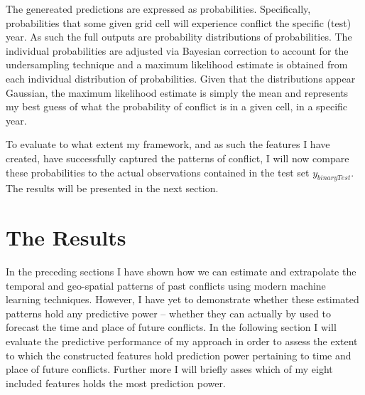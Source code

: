 \documentclass[a4paper]{article}
\begin{document}




The genereated predictions are expressed as probabilities. Specifically, probabilities that some given grid cell will experience conflict the specific (test) year. As such the full outputs are probability distributions of probabilities. The individual probabilities are adjusted via Bayesian correction to account for the undersampling technique and a maximum likelihood estimate is obtained from each individual distribution of probabilities. Given that the distributions appear Gaussian, the maximum likelihood estimate is simply the mean and represents my best guess of what the probability of conflict is in a given cell, in a specific year.\par 


To evaluate to what extent my framework, and as such the features I have created, have successfully captured the patterns of conflict, I will now compare these probabilities to the actual observations contained in the test set $y_{binaryTest}$. The results will be presented in the next section.\par

\section{The Results}

In the preceding sections I have shown how we can estimate and extrapolate the temporal and geo-spatial patterns of past conflicts using modern machine learning techniques. However, I have yet to demonstrate whether these estimated patterns hold any predictive power -- whether they can actually by used to forecast the time and place of future conflicts. In the following section I will evaluate the predictive performance of my approach in order to assess the extent to which the constructed features hold prediction power pertaining to time and place of future conflicts. Further more I will briefly asses which of my eight included features holds the most prediction power.\par 
\end{document}
